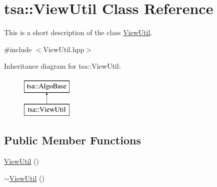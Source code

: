 \hypertarget{classtsa_1_1_view_util}{}\section{tsa\+:\+:View\+Util Class Reference}
\label{classtsa_1_1_view_util}


This is a short description of the class \hyperlink{classtsa_1_1_view_util}{View\+Util}.  




{\ttfamily \#include $<$View\+Util.\+hpp$>$}

Inheritance diagram for tsa\+:\+:View\+Util\+:\begin{figure}[H]
\begin{center}
\leavevmode
\includegraphics[height=2.000000cm]{classtsa_1_1_view_util}
\end{center}
\end{figure}
\subsection*{Public Member Functions}
\begin{DoxyCompactItemize}
\item 
\hyperlink{classtsa_1_1_view_util_a13cb83b6780a27612d34d893272e72f9}{View\+Util} ()
\item 
\hyperlink{classtsa_1_1_view_util_a3c85be8329c8c4f7d60d8ba78b59b4e4}{$\sim$\+View\+Util} ()
\end{DoxyCompactItemize}

